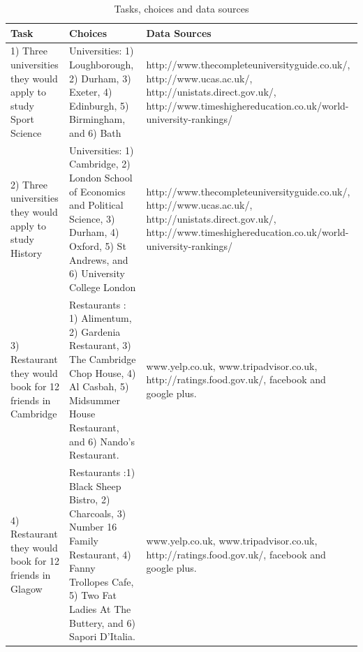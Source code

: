 \documentclass{sigchi}
\begin{document}
\begin{table}[t]
\begin{center}
\small
\begin{tabular}{|p{4cm}|p{6cm}|p{6cm}|}
\hline
Task	 &Choices	&Data Sources\\
\hline
1) Three universities they would apply to study Sport Science & Universities: 1) Loughborough,  2) Durham,  3) Exeter, 4) Edinburgh, 5) Birmingham, and 6) Bath & http://www.thecompleteuniversityguide.co.uk/, http://www.ucas.ac.uk/, http://unistats.direct.gov.uk/, http://www.timeshighereducation.co.uk/world-university-rankings/ \\
\hline
2) Three universities they would apply to study History & Universities: 1) Cambridge, 2) London School of Economics and Political Science, 3) Durham, 4) Oxford, 5) St Andrews, and 6) University College London & http://www.thecompleteuniversityguide.co.uk/, http://www.ucas.ac.uk/, http://unistats.direct.gov.uk/, http://www.timeshighereducation.co.uk/world-university-rankings/ \\
\hline
3) Restaurant they would book for 12 friends in Cambridge&Restaurants : 1) Alimentum, 2) Gardenia Restaurant, 3) The Cambridge Chop House, 4) Al Casbah, 5) Midsummer House Restaurant, and 6) Nando's Restaurant. & www.yelp.co.uk, www.tripadvisor.co.uk, http://ratings.food.gov.uk/, facebook and google plus.\\
\hline
4) Restaurant they would book for 12 friends in Glagow & Restaurants :1) Black Sheep Bistro, 2) Charcoals, 3) Number 16 Family Restaurant, 4) Fanny Trollopes Cafe, 5) Two Fat Ladies At The Buttery, and 6) Sapori D'Italia. & www.yelp.co.uk, www.tripadvisor.co.uk, http://ratings.food.gov.uk/, facebook and google plus.\\
\hline
\end{tabular}
\end{center}
\caption{Tasks, choices and data sources} \label{tab:studyfactors}
\normalsize
\end{table}%




\end{document}
